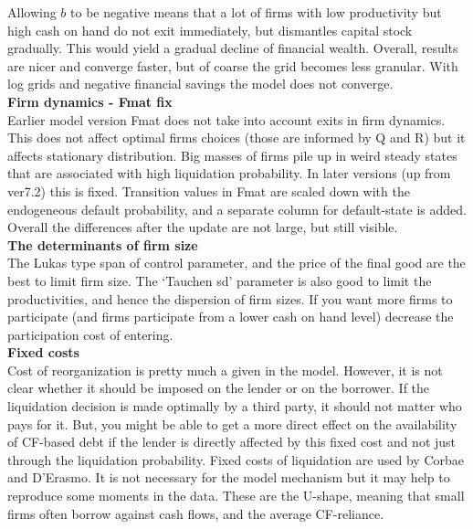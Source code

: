 \documentclass[12pt]{article}
\begin{document}
Allowing $b$ to be negative means that a lot of firms with low productivity but high cash on hand do not exit immediately, but dismantles capital stock gradually. This would yield a gradual decline of financial wealth. Overall, results are nicer and converge faster, but of coarse the grid becomes less granular. With log grids and negative financial savings the model does not converge.  \vspace{3mm} \\
\textbf{Firm dynamics - Fmat fix} \\ 
Earlier model version Fmat does not take into account exits in firm dynamics. This does not affect optimal firms choices (those are informed by Q and R) but it affects stationary distribution. Big masses of firms pile up in weird steady states that are associated with high liquidation probability. In later versions (up from ver7.2) this is fixed. Transition values in Fmat are scaled down with the endogeneous default probability, and a separate column for default-state is added. Overall the differences after the update are not large, but still visible. \vspace{3mm} \\
\textbf{The determinants of firm size} \\
 The Lukas type span of control parameter, and the price of the final good are the best to limit firm size. The `Tauchen sd' parameter is also good to limit the productivities, and hence the dispersion of firm sizes. If you want more firms to participate (and firms participate from a lower cash on hand level) decrease the participation cost of entering. \vspace{3mm} \\
\textbf{Fixed costs} \\
Cost of reorganization is pretty much a given in the model. However, it is not clear whether it should be imposed on the lender or on the borrower. If the liquidation decision is made optimally by a third party, it should not matter who pays for it. But, you might be able to get a more direct effect on the  availability of CF-based debt if the lender is directly affected by this fixed cost and not just through the liquidation probability. Fixed costs of liquidation are used by Corbae and D'Erasmo. It is not necessary for the model mechanism but it may help to reproduce some moments in the data. These are the U-shape, meaning that small firms often borrow against cash flows, and the average CF-reliance. \vspace{3mm} \\
\end{document}
